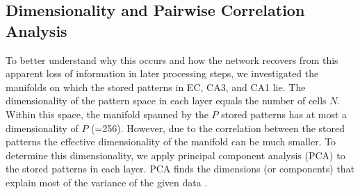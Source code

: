\documentclass[utf8]{frontiersSCNS} %
\begin{document}
\subsection{Dimensionality and Pairwise Correlation Analysis}

To better understand why this occurs and how the network recovers from this apparent loss of information in later processing steps, we investigated the manifolds on which the stored patterns in EC, CA3, and CA1 lie. The dimensionality of the pattern space in each layer equals the number of cells $N$. Within this space, the manifold spanned by the $P$ stored patterns has at most a dimensionality of $P$ (=256). However, due to the correlation between the stored patterns the effective dimensionality of the manifold can be much smaller. To determine this dimensionality, we apply principal component analysis (PCA) to the stored patterns in each layer. PCA finds the dimensions (or components) that explain most of the variance of the given data \cite[chapter 4]{Hastie2009}. 
\end{document}
